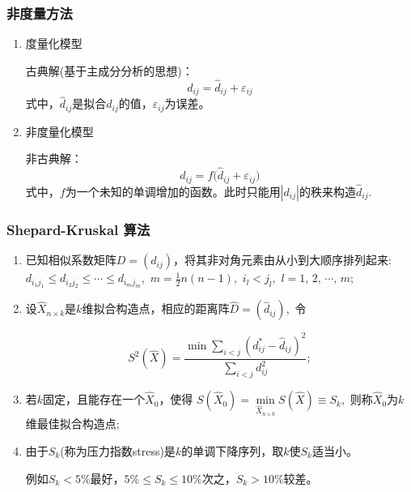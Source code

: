 \documentclass[UTF8, compress]{ctexbeamer}
\begin{document}
	\begin{frame}
		\frametitle{\heiti 非度量方法}
		
		\begin{enumerate}
			\item<1-> 度量化模型
			
			古典解(基于主成分分析的思想)：
			\begin{equation*}
			d_{ij}=\widehat{d}_{ij}+\varepsilon_{ij}
			\end{equation*}
		\pause
			式中，$\widehat{d}_{ij}$是拟合$d_{ij}$的值，$\varepsilon_{ij}$为误差。
			\vspace{1cm}
			
			\item<3-> 非度量化模型
			
			非古典解：
			\begin{equation*}
			d_{ij}=f\big(\widehat{d}_{ij}+\varepsilon_{ij}\big)
			\end{equation*}
		\onslide<4->
			式中，$f$为一个未知的单调增加的函数。此时只能用$|d_{ij}|$的秩来构造$\widehat{d}_{ij}$.
		
		\end{enumerate}
	\end{frame}
	
	
	\begin{frame}
		\frametitle{{\sffamily Shepard-Kruskal} {\heiti 算法}}
		
		\begin{enumerate}
			\item<1-> 已知相似系数矩阵$D=(d_{ij})$，将其非对角元素由从小到大顺序排列起来:
			$d_{i_1j_1}\leqslant d_{i_2j_2}\leqslant \cdots \leqslant d_{i_mj_m}$,\  
			$m=\frac12n(n-1)$,\ $i_l<j_l$,\ 
			$l=1,\,2,\,\cdots,\,m$; 
			
			\item<2-> 设$\widehat{X}_{n\times k}$是$k$维拟合构造点，相应的距离阵$\widehat{D}=(\widehat{d}_{ij})$,\ 令
			
			\onslide<3->
			\begin{equation}
			S^2(\widehat{X})=\dfrac{\min\sum\limits_{i<j}(d_{ij}^*-\widehat{d}_{ij})^2}{\sum\limits_{i<j}d_{ij}^2}; 
			\end{equation}
			
			\item<4-> 若$k$固定，且能存在一个$\widehat{X}_0$，使得
			$S(\widehat{X}_0)=\min\limits_{\widehat{X}_{n\times k}}S(\widehat{X})\equiv S_k$,\ 则称$\widehat{X}_0$为$k$维最佳拟合构造点; 
			
			\item<5-| alert@5> 由于$S_k$(称为压力指数stress)是$k$的单调下降序列，取$k$使$S_k$适当小。
			
			\onslide<6-> \alert{例如$S_k<5\%$最好，$5\%\leqslant S_k \leqslant 10\%$次之，$S_k>10\%$较差。}
		\end{enumerate}

	\end{frame}
\end{document}
